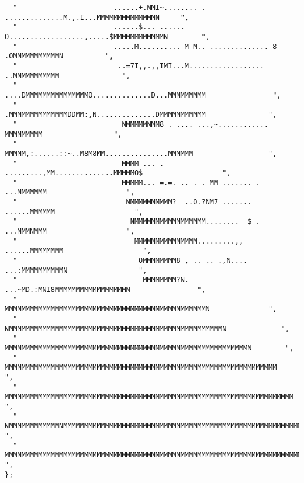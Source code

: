 \begin{lstlisting}
  "                       ......+.NMI~........ . ..............M.,.I...MMMMMMMMMMMMMMN     ",
  "                       ......$... ...... O..................,.....$MMMMMMMMMMMMN        ",
  "                       .....M.......... M M.. .............. 8  .OMMMMMMMMMMMN          ",
  "                        ..=7I,,.,,IMI...M.................. ..MMMMMMMMMMM               ",
  "                        ....DMMMMMMMMMMMMMMMO..............D...MMMMMMMMM                ",
  "                         .MMMMMMMMMMMMMMDDMM:,N..............DMMMMMMMMMMM               ",
  "                         NMMMMMNMM8 . .... ...,~............  MMMMMMMMM                 ",
  "                         MMMMM,:......::~..M8M8MM...............MMMMMM                  ",
  "                         MMMM ... . .........,MM..............MMMMMO$                   ",
  "                         MMMMM... =.=. .. . . MM ....... . ...MMMMMMM                   ",
  "                          NMMMMMMMMMM?  ..O.?NM7 ....... ......MMMMMM                   ",
  "                           NMMMMMMMMMMMMMMMMM........  $ . ...MMMNMMM                   ",
  "                            MMMMMMMMMMMMMMM.........,, ......MMMMMMMM                   ",
  "                             OMMMMMMMM8 , .. .. .,N.... ...:MMMMMMMMMMN                 ",
  "                              MMMMMMMM?N. ...~MD.:MNI8MMMMMMMMMMMMMMMMMN                ",
  "                         MMMMMMMMMMMMMMMMMMMMMMMMMMMMMMMMMMMMMMMMMMMMMMMMN              ",
  "                      NMMMMMMMMMMMMMMMMMMMMMMMMMMMMMMMMMMMMMMMMMMMMMMMMMMMN             ",
  "                     MMMMMMMMMMMMMMMMMMMMMMMMMMMMMMMMMMMMMMMMMMMMMMMMMMMMMMMMMMN        ",
  "                  MMMMMMMMMMMMMMMMMMMMMMMMMMMMMMMMMMMMMMMMMMMMMMMMMMMMMMMMMMMMMMMMM     ",
  "               MMMMMMMMMMMMMMMMMMMMMMMMMMMMMMMMMMMMMMMMMMMMMMMMMMMMMMMMMMMMMMMMMMMMM    ",
  "              NMMMMMMMMMMMMNMMMMMMMMMMMMMMMMMMMMMMMMMMMMMMMMMMMMMMMMMMMMMMMMMMMMMMMMMM  ",
  "             MMMMMMMMMMMMMMMMMMMMMMMMMMMMMMMMMMMMMMMMMMMMMMMMMMMMMMMMMMMMMMMMMMMMMMMMMM ",
};


\end{lstlisting}
